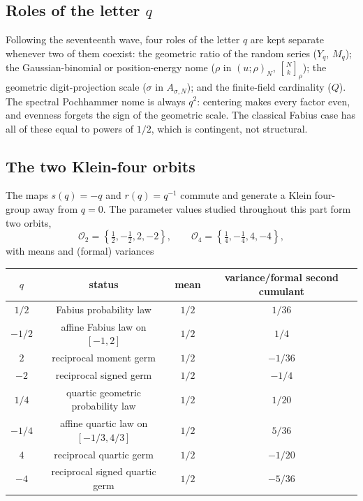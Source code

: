 \documentclass[11pt,oneside]{article}
\numberwithin{equation}{section}
\theoremstyle{definition}
\theoremstyle{remark}
\newcommand{\qbinom}[3]{\genfrac{[}{]}{0pt}{}{#1}{#2}_{#3}}
\begin{document}
\subsection{Roles of the letter \texorpdfstring{$q$}{q}}

Following the seventeenth wave, four roles of the letter $q$ are kept separate
whenever two of them coexist: the geometric ratio of the random series
($Y_q$, $M_q$); the Gaussian-binomial or position-energy nome ($\rho$ in
$(u;\rho)_N$, $\qbinom Nk\rho$); the geometric digit-projection scale
($\sigma$ in $A_{\sigma,N}$); and the finite-field cardinality ($Q$).  The
spectral Pochhammer nome is always $q^2$: centering makes every factor even,
and evenness forgets the sign of the geometric scale.  The classical Fabius
case has all of these equal to powers of $1/2$, which is contingent, not
structural.

\subsection{The two Klein-four orbits}

The maps $s(q)=-q$ and $r(q)=q^{-1}$ commute and generate a Klein four-group
away from $q=0$.  The parameter values studied throughout this part form two
orbits,
\[
 \mathcal O_2=\left\{\tfrac12,-\tfrac12,2,-2\right\},
 \qquad
 \mathcal O_4=\left\{\tfrac14,-\tfrac14,4,-4\right\},
\]
with means and (formal) variances
\begin{center}
\begin{tabular}{c c c c}
\toprule
$q$ & status & mean & variance/formal second cumulant \\
\midrule
$1/2$ & Fabius probability law & $1/2$ & $1/36$ \\
$-1/2$ & affine Fabius law on $[-1,2]$ & $1/2$ & $1/4$ \\
$2$ & reciprocal moment germ & $1/2$ & $-1/36$ \\
$-2$ & reciprocal signed germ & $1/2$ & $-1/4$ \\
\addlinespace
$1/4$ & quartic geometric probability law & $1/2$ & $1/20$ \\
$-1/4$ & affine quartic law on $[-1/3,4/3]$ & $1/2$ & $5/36$ \\
$4$ & reciprocal quartic germ & $1/2$ & $-1/20$ \\
$-4$ & reciprocal signed quartic germ & $1/2$ & $-5/36$ \\
\bottomrule
\end{tabular}
\end{center}
\end{document}
